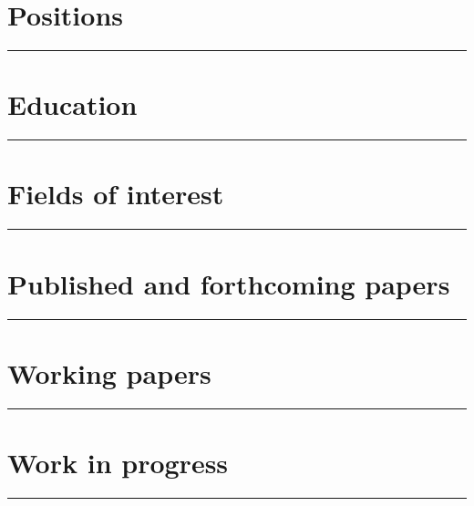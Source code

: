 \documentclass[11pt,plain,titleabove]{simple_cv_hmg}
\newif\ifpubrecord
\begin{document}
  \section{Positions}
  \vspace{-1cm}
  \rule{\textwidth}{0.5pt}
  \vspace{-.9cm}
  \begin{topic}
    
  \end{topic}
  \vspace{-0.5cm}

  \section{Education}
  \vspace{-1cm}
  \rule{\textwidth}{0.5pt}
  \vspace{-.9cm}
  \begin{topic}
  
  \end{topic}
  \vspace{-0.5cm}

  \section{Fields of interest}
  \vspace{-1cm}
  \rule{\textwidth}{0.5pt}
  
  \vspace{-0.3cm}

\fi 

  \section{Published and forthcoming papers}
  \vspace{-1cm}
  \rule{\textwidth}{0.5pt}
  
  \vspace{-0.3cm}

  \section{Working papers}
  \vspace{-1cm}
  \rule{\textwidth}{0.5pt}
  
  \vspace{-0.3cm}


\ifpubrecord
\else

  \section{Work in progress}
  \vspace{-1cm}
  \rule{\textwidth}{0.5pt}
  
  \vspace{-0.3cm}
\end{document}
